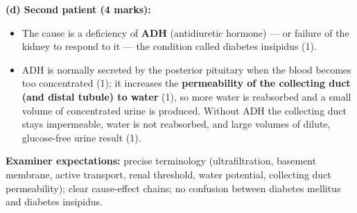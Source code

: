 \documentclass[11pt]{article}
\begin{document}
\begin{corrige}
\begin{itemize}
\end{itemize}
\textbf{(d) Second patient (4 marks):}
\begin{itemize}
\item The cause is a deficiency of \textbf{ADH} (antidiuretic hormone) — or failure of the kidney to respond to it — the condition called diabetes insipidus (1).
\item ADH is normally secreted by the posterior pituitary when the blood becomes too concentrated (1); it increases the \textbf{permeability of the collecting duct (and distal tubule) to water} (1), so more water is reabsorbed and a small volume of concentrated urine is produced. Without ADH the collecting duct stays impermeable, water is not reabsorbed, and large volumes of dilute, glucose-free urine result (1).
\end{itemize}
\textbf{Examiner expectations:} precise terminology (ultrafiltration, basement membrane, active transport, renal threshold, water potential, collecting duct permeability); clear cause-effect chains; no confusion between diabetes mellitus and diabetes insipidus.
\end{corrige}
\end{document}

